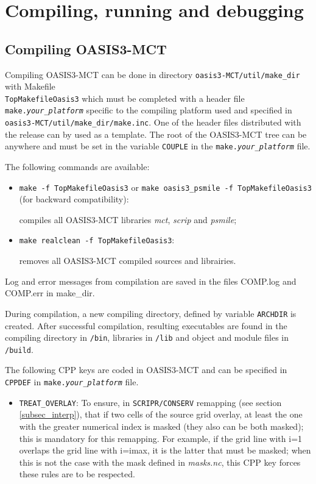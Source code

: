 \newpage
%

\chapter{Compiling, running and debugging}
\label{sec_compilationrunning}

\section{Compiling OASIS3-MCT}
\label{subsec_compile}

Compiling OASIS3-MCT can be done in directory {\tt oasis3-MCT/util/make\_dir}
with Makefile \\ {\tt TopMakefileOasis3} which must be completed with a header file {\tt
  make.{\it your\_platform}} specific to the compiling platform used
and specified in {\tt oasis3-MCT/util/make\_dir/make.inc}.  One of the
header files distributed with the release can by used as a template.  The root 
of the OASIS3-MCT tree
can be anywhere and must be set in the variable {\tt COUPLE} in the
{\tt make.{\it your\_platform}} file. 

The following commands are available:

\begin{itemize}
\item {\tt make -f TopMakefileOasis3} or {\tt make oasis3\_psmile -f
  TopMakefileOasis3} (for backward compatibility):

  compiles all OASIS3-MCT libraries {\it mct}, {\it scrip} and {\it psmile}; 

\item {\tt make realclean -f  TopMakefileOasis3}: 

  removes all OASIS3-MCT compiled sources and librairies.

\end{itemize}

Log and error messages from compilation are saved in the files
COMP.log and COMP.err in make\_dir.

During compilation, a new compiling directory, defined by variable {\tt ARCHDIR}
is created.  After successful
compilation, resulting executables are found in the compiling directory in {\tt /bin}, libraries in {\tt /lib} and object
and module files in {\tt /build}.

The following CPP keys are coded in OASIS3-MCT and
can be specified in {\tt CPPDEF} in {\tt make.{\it your\_platform}} file.

\begin{itemize}

\item {\tt TREAT\_OVERLAY}: To ensure, in {\tt SCRIPR/CONSERV} remapping (see section
  \ref{subsec_interp}), that if two cells of the source grid overlay,
  at least the one with the greater numerical index is masked (they
  also can be both masked); this is mandatory for this remapping. For
  example, if the grid line with i=1 overlaps the grid line with
  i=imax, it is the latter that must be masked; when this is not the
  case with the mask defined in {\it masks.nc}, this CPP key forces
  these rules are to be respected.
\end{itemize}

